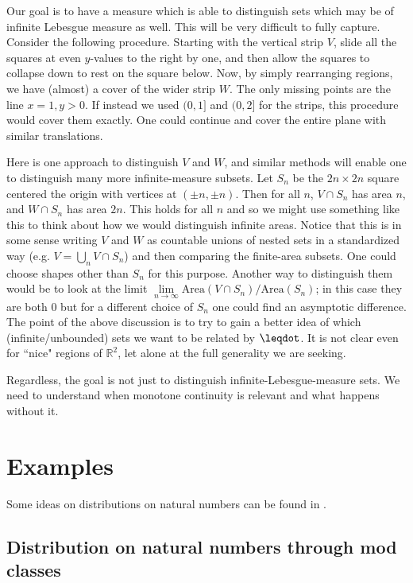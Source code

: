 \documentclass[10pt, onecolumn, nofootinbib]{revtex4-1}
\begin{document}
Our goal is to have a measure which is able to distinguish sets which may be of infinite Lebesgue measure as well. This will be very difficult to fully capture. Consider the following procedure. Starting with the vertical strip $V$, slide all the squares at even $y$-values to the right by one, and then allow the squares to collapse down to rest on the square below. Now, by simply rearranging regions, we have (almost) a cover of the wider strip $W$. The only missing points are the line $x=1, y>0$. If instead we used $(0,1]$ and $(0,2]$ for the strips, this procedure would cover them exactly. One could continue and cover the entire plane with similar translations. 

Here is one approach to distinguish $V$ and $W$, and similar methods will enable one to distinguish many more infinite-measure subsets. Let $S_n$ be the $2n\times 2n$ square centered the origin with vertices at $(\pm n, \pm n)$. Then for all $n$, $V\cap S_n$ has area $n$, and $W\cap S_n$ has area $2n$. This holds for all $n$ and so we might use something like this to think about how we would distinguish infinite areas. Notice that this is in some sense writing $V$ and $W$ as countable unions of nested sets in a standardized way (e.g. $V = \bigcup\limits_n V\cap S_n$) and then comparing the finite-area subsets. One could choose shapes other than $S_n$ for this purpose. Another way to distinguish them would be to look at the limit $\lim\limits_{n\to\infty}\text{Area}(V\cap S_n)/\text{Area}(S_n)$; in this case they are both 0 but for a different choice of $S_n$ one could find an asymptotic difference. 
The point of the above discussion is to try to gain a better idea of which (infinite/unbounded) sets we want to be related by $\finer$. It is not clear even for ``nice" regions of $\mathbb{R}^2$, let alone at the full generality we are seeking. 

Regardless, the goal is not just to distinguish infinite-Lebesgue-measure sets. We need to understand when monotone continuity is relevant and what happens without it. 

\section{Examples}

Some ideas on distributions on natural numbers can be found in \cite{Schirokauer2007}.

\subsection{Distribution on natural numbers through mod classes}
\end{document}
